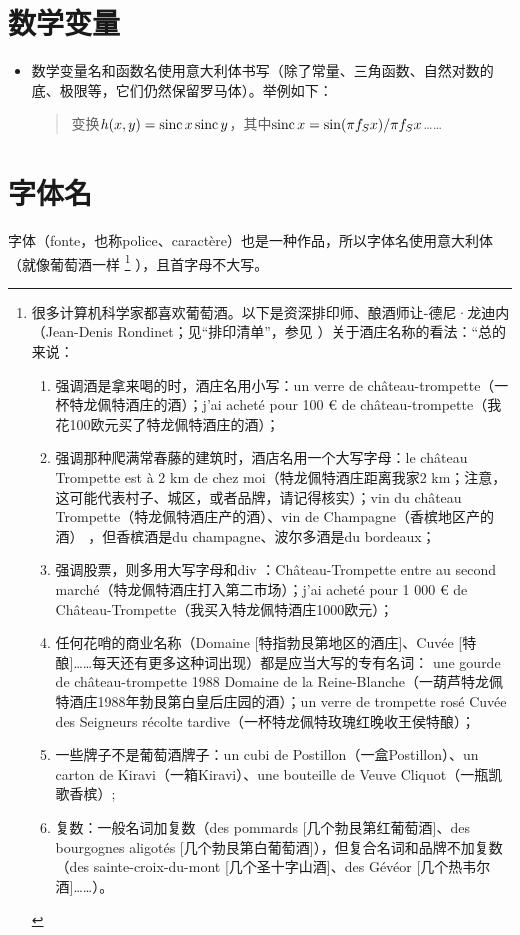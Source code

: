\section{数学变量}

\begin{itemize}
    \item 数学变量名和函数名使用意大利体书写（除了常量、三角函数、自然对数的底、极限等，它们仍然保留罗马体）。举例如下：
    
    \begin{quote}
        变换$h(x, y) = {\rm sinc}\,x\,{\rm sinc}\,y$，其中$ {\rm sinc}\,x=\sin(\pi f_S x)/\pi f_S x$……
    \end{quote}
\end{itemize}

\section{字体名}

字体（fonte，也称police、caractère）也是一种作品，所以字体名使用意大利体（就像葡萄酒一样
    \footnote{很多计算机科学家都喜欢葡萄酒。以下是资深排印师、酿酒师让-德尼·龙迪内（Jean-Denis Rondinet；见``排印清单''，参见%
    ）关于酒庄名称的看法：``总的来说：
    \begin{enumerate}[label=\alph*)]
        \item 强调酒是拿来喝的时，酒庄名用小写：un verre de château-trompette（一杯特龙佩特酒庄的酒）；j'ai acheté pour 100 € de château-trompette（我花100欧元买了特龙佩特酒庄的酒）；
        \item 强调那种爬满常春藤的建筑时，酒店名用一个大写字母：le château Trompette est à 2 km de chez moi（特龙佩特酒庄距离我家2 km；注意，这可能代表村子、城区，或者品牌，请记得核实）；vin du château Trompette（特龙佩特酒庄产的酒）、vin de Champagne（香槟地区产的酒） ，但香槟酒是du champagne、波尔多酒是du bordeaux；
        \item 强调股票，则多用大写字母和div%
        ：Château-Trompette entre au second marché（特龙佩特酒庄打入第二市场）；j'ai acheté pour 1 000 € de Château-Trompette（我买入特龙佩特酒庄1000欧元）；
        \item 任何花哨的商业名称（Domaine [特指勃艮第地区的酒庄]、Cuvée [特酿]……每天还有更多这种词出现）都是应当大写的专有名词： une gourde de château-trompette 1988 Domaine de la Reine-Blanche（一葫芦特龙佩特酒庄1988年勃艮第白皇后庄园的酒）；un verre de trompette rosé Cuvée des Seigneurs récolte tardive（一杯特龙佩特玫瑰红晚收王侯特酿）；
        \item 一些牌子不是葡萄酒牌子：un cubi de Postillon（一盒Postillon）、un carton de Kiravi（一箱Kiravi）、une bouteille de Veuve Cliquot（一瓶凯歌香槟）;
        \item 复数：一般名词加复数（des pommards [几个勃艮第红葡萄酒]、des bourgognes aligotés [几个勃艮第白葡萄酒]），但复合名词和品牌不加复数（des sainte-croix-du-mont [几个圣十字山酒]、des Gévéor [几个热韦尔酒]……）。
    \end{enumerate}}
），且首字母不大写。

